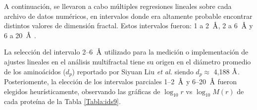 	A continuaci\'{o}n, se llevaron a cabo m\'{u}ltiples regresiones lineales sobre cada archivo de datos num\'{e}ricos, en intervalos donde era altamente probable encontrar distintos valores de dimensi\'{o}n fractal. Estos intervalos fueron: 1 a 2~$\textup{\r{A}}$, 2 a 6~$\textup{\r{A}}$ y 6 a 20~$\textup{\r{A}}$ \cite{Enright2005, Liu2020}.	
	
	
	
	La selecci\'on del intervalo 2--6~$\textup{\r{A}}$ utilizado para la medici\'on o implementaci\'on de ajustes lineales en el an\'alisis multifractal tiene su origen en el di\'ametro promedio de los amino\'acidos ($d_p$) reportado por Siyuan Liu \textit{et al.} \cite{Liu2020} siendo $d_p \approx$ 4,188 $\textup{\r{A}}$. Posteriomente, la elecci\'{o}n de los intervalos parciales 1--2~$\textup{\r{A}}$ y 6--20~$\textup{\r{A}}$ fueron elegidos heur\'{i}sticamente, observando las gr\'{a}ficas de $\log_{10}r$ vs $\log_{10}M(r)$ de cada prote\'{i}na de la Tabla \ref{Tabla:ids9}.
	
